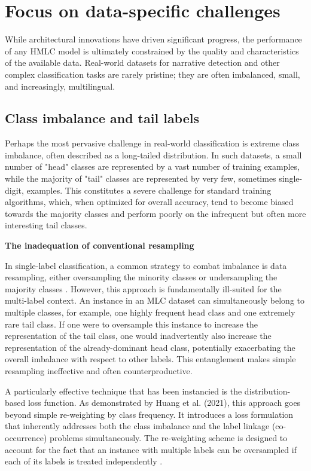 \chapter{Focus on data-specific challenges}
While architectural innovations have driven significant progress, the performance of any HMLC model is ultimately constrained by the quality and characteristics of the available data. Real-world datasets for narrative detection and other complex classification tasks are rarely pristine; they are often imbalanced, small, and increasingly, multilingual.

\section{Class imbalance and tail labels}
Perhaps the most pervasive challenge in real-world classification is extreme class imbalance, often described as a long-tailed distribution. In such datasets, a small number of "head" classes are represented by a vast number of training examples, while the majority of "tail" classes are represented by very few, sometimes single-digit, examples. \cite{huang-etal-2021-balancing} This constitutes a severe challenge for standard training algorithms, which, when optimized for overall accuracy, tend to become biased towards the majority classes and perform poorly on the infrequent but often more interesting tail classes.


\textbf{The inadequation of conventional resampling}

In single-label classification, a common strategy to combat imbalance is data resampling, either oversampling the minority classes or undersampling the majority classes \cite{Luque2019The,Thabtah2020Data}. However, this approach is fundamentally ill-suited for the multi-label context. An instance in an MLC dataset can simultaneously belong to multiple classes, for example, one highly frequent head class and one extremely rare tail class. If one were to oversample this instance to increase the representation of the tail class, one would inadvertently also increase the representation of the already-dominant head class, potentially exacerbating the overall imbalance with respect to other labels. This entanglement makes simple resampling ineffective and often counterproductive. \cite{yuan2024research}


A particularly effective technique that has been instancied is the distribution-based loss function. As demonstrated by Huang et al. (2021), this approach goes beyond simple re-weighting by class frequency. It introduces a loss formulation that inherently addresses both the class imbalance and the label linkage (co-occurrence) problems simultaneously. The re-weighting scheme is designed to account for the fact that an instance with multiple labels can be oversampled if each of its labels is treated independently \cite{huang-etal-2021-balancing}.

